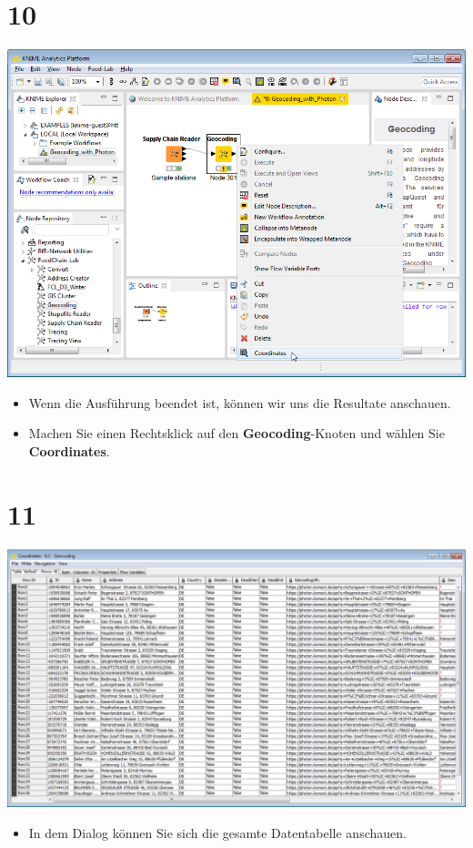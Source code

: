 \documentclass[10pt]{beamer}
\begin{document}
\section{10}
\begin{frame}
	\begin{center}
  		\includegraphics[height=0.6\textheight]{10.png}
	\end{center}
	\begin{itemize}
		\item Wenn die Ausführung beendet ist, können wir uns die Resultate anschauen.
		\item Machen Sie einen Rechtsklick auf den \textbf{Geocoding}-Knoten und wählen Sie \textbf{Coordinates}.
	\end{itemize}
\end{frame}

\section{11}
\begin{frame}
	\begin{center}
  		\includegraphics[height=0.6\textheight]{11.png}
	\end{center}
	\begin{itemize}
		\item In dem Dialog können Sie sich die gesamte Datentabelle anschauen.
	\end{itemize}
\end{frame}
\end{document}
